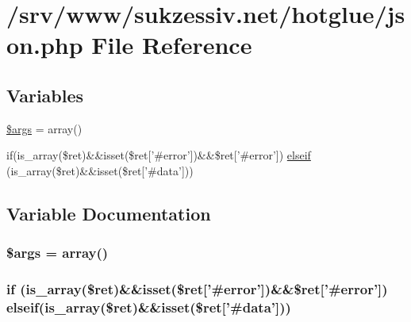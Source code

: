 \hypertarget{json_8php}{
\section{/srv/www/sukzessiv.net/hotglue/json.php File Reference}
\label{json_8php}
}
\subsection*{Variables}
\begin{CompactItemize}
\item 
\hyperlink{json_8php_67e94494731d99ed23b123e95175bc10}{\$args} = array()
\item 
if(is\_\-array(\$ret)\&\&isset(\$ret\mbox{[}'\#error'\mbox{]})\&\&\$ret\mbox{[}'\#error'\mbox{]}) \hyperlink{json_8php_ffd32ec1771cd364116738727d3a1ed8}{elseif} (is\_\-array(\$ret)\&\&isset(\$ret\mbox{[}'\#data'\mbox{]}))
\end{CompactItemize}


\subsection{Variable Documentation}
\hypertarget{json_8php_67e94494731d99ed23b123e95175bc10}{
\subsubsection[{\$args}]{\setlength{\rightskip}{0pt plus 5cm}\$args = array()}}
\label{json_8php_67e94494731d99ed23b123e95175bc10}


\hypertarget{json_8php_ffd32ec1771cd364116738727d3a1ed8}{
\subsubsection[{elseif}]{\setlength{\rightskip}{0pt plus 5cm}if (is\_\-array(\$ret)\&\&isset(\$ret\mbox{[}'\#error'\mbox{]})\&\&\$ret\mbox{[}'\#error'\mbox{]}) {\bf elseif}(is\_\-array(\$ret)\&\&isset(\$ret\mbox{[}'\#data'\mbox{]}))}}
\label{json_8php_ffd32ec1771cd364116738727d3a1ed8}


